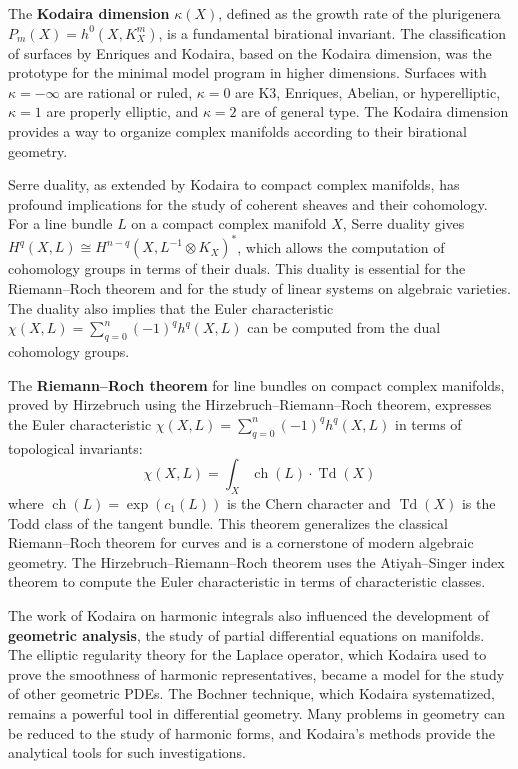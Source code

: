 The \textbf{Kodaira dimension} $\kappa(X)$, defined as the growth rate
of the plurigenera $P_m(X) = h^0(X, K_X^m)$, is a fundamental
birational invariant. The classification of surfaces by Enriques and
Kodaira, based on the Kodaira dimension, was the prototype for the
minimal model program in higher dimensions. Surfaces with $\kappa =
-\infty$ are rational or ruled, $\kappa = 0$ are K3, Enriques, Abelian,
or hyperelliptic, $\kappa = 1$ are properly elliptic, and $\kappa = 2$
are of general type. The Kodaira dimension provides a way to organize
complex manifolds according to their birational geometry.

Serre duality, as extended by Kodaira to compact complex manifolds, has
profound implications for the study of coherent sheaves and their
cohomology. For a line bundle $L$ on a compact complex manifold $X$,
Serre duality gives $H^q(X, L) \cong H^{n-q}(X, L^{-1} \otimes K_X)^*$,
which allows the computation of cohomology groups in terms of their
duals. This duality is essential for the Riemann--Roch theorem and for
the study of linear systems on algebraic varieties. The duality also
implies that the Euler characteristic
$\chi(X, L) = \sum_{q=0}^n (-1)^q h^q(X, L)$ can be computed from the
dual cohomology groups.

The \textbf{Riemann--Roch theorem} for line bundles on compact complex
manifolds, proved by Hirzebruch using the Hirzebruch--Riemann--Roch
theorem, expresses the Euler characteristic $\chi(X, L) = \sum_{q=0}^n
(-1)^q h^q(X, L)$ in terms of topological invariants:
\[\chi(X, L) = \int_X \operatorname{ch}(L) \cdot \operatorname{Td}(X)\]
where $\operatorname{ch}(L) = \exp(c_1(L))$ is the Chern character and
$\operatorname{Td}(X)$ is the Todd class of the tangent bundle. This
theorem generalizes the classical Riemann--Roch theorem for curves and
is a cornerstone of modern algebraic geometry. The
Hirzebruch--Riemann--Roch theorem uses the Atiyah--Singer index theorem
to compute the Euler characteristic in terms of characteristic classes.

The work of Kodaira on harmonic integrals also influenced the
development of \textbf{geometric analysis}, the study of partial
differential equations on manifolds. The elliptic regularity theory for
the Laplace operator, which Kodaira used to prove the smoothness of
harmonic representatives, became a model for the study of other
geometric PDEs. The Bochner technique, which Kodaira systematized,
remains a powerful tool in differential geometry. Many problems in
geometry can be reduced to the study of harmonic forms, and Kodaira's
methods provide the analytical tools for such investigations.

